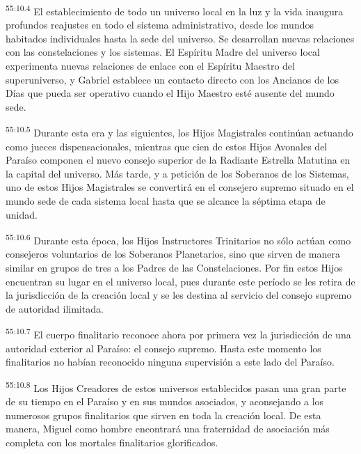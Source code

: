 \par
\textsuperscript{55:10.4} El establecimiento de todo un universo local en la luz y la vida inaugura profundos reajustes en todo el sistema administrativo, desde los mundos habitados individuales hasta la sede del universo. Se desarrollan nuevas relaciones con las constelaciones y los sistemas. El Espíritu Madre del universo local experimenta nuevas relaciones de enlace con el Espíritu Maestro del superuniverso, y Gabriel establece un contacto directo con los Ancianos de los Días que pueda ser operativo cuando el Hijo Maestro esté ausente del mundo sede.

\par
\textsuperscript{55:10.5} Durante esta era y las siguientes, los Hijos Magistrales continúan actuando como jueces dispensacionales, mientras que cien de estos Hijos Avonales del Paraíso componen el nuevo consejo superior de la Radiante Estrella Matutina en la capital del universo. Más tarde, y a petición de los Soberanos de los Sistemas, uno de estos Hijos Magistrales se convertirá en el consejero supremo situado en el mundo sede de cada sistema local hasta que se alcance la séptima etapa de unidad.

\par
\textsuperscript{55:10.6} Durante esta época, los Hijos Instructores Trinitarios no sólo actúan como consejeros voluntarios de los Soberanos Planetarios, sino que sirven de manera similar en grupos de tres a los Padres de las Constelaciones. Por fin estos Hijos encuentran su lugar en el universo local, pues durante este período se les retira de la jurisdicción de la creación local y se les destina al servicio del consejo supremo de autoridad ilimitada.

\par
\textsuperscript{55:10.7} El cuerpo finalitario reconoce ahora por primera vez la jurisdicción de una autoridad exterior al Paraíso: el consejo supremo. Hasta este momento los finalitarios no habían reconocido ninguna supervisión a este lado del Paraíso.

\par
\textsuperscript{55:10.8} Los Hijos Creadores de estos universos establecidos pasan una gran parte de su tiempo en el Paraíso y en sus mundos asociados, y aconsejando a los numerosos grupos finalitarios que sirven en toda la creación local. De esta manera, Miguel como hombre encontrará una fraternidad de asociación más completa con los mortales finalitarios glorificados.

